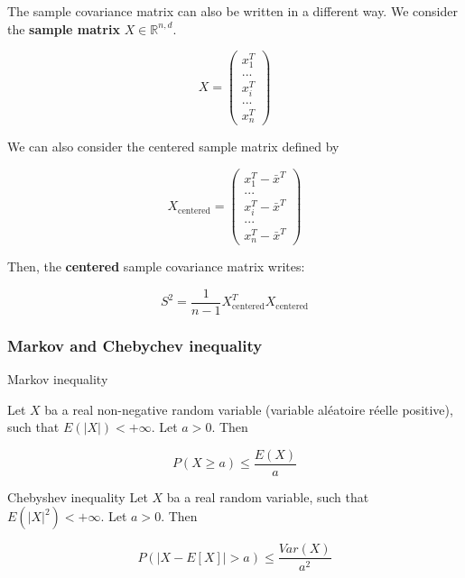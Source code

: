 \documentclass[
10pt, %
a4paper, %
oneside, %
headinclude,footinclude, %
BCOR5mm, %
]{scrartcl}
\begin{document}
\begin{remark}
    The sample covariance matrix can also be written in a different way. We consider the \textbf{{sample matrix}} $X\in \mathbb{R}^{n,d}$.

    \begin{equation*}
    X=\begin{pmatrix}
	x_1^T\\
...\\
	x_i^T\\
...\\
	x_n^T
\end{pmatrix}
    \end{equation*}

    We can also consider the centered sample matrix defined by

    \begin{equation*}
	X_{\text{centered}}=\begin{pmatrix}
	x_1^T- \bar{x}^T\\
...\\
	x_i^T- \bar{x}^T\\
...\\
	x_n^T- \bar{x}^T
\end{pmatrix}
    \end{equation*}

    Then, the \textbf{{centered}} sample covariance matrix writes:

    \begin{equation*}
	S^2 = \frac{1}{n-1} X_{\text{centered}}^TX_{\text{centered}}
    \end{equation*}
\end{remark}

\subsubsection{\large\color{Periwinkle}Markov and Chebychev inequality}

\begin{proposition}{Markov inequality}

    Let $X$ ba a real non-negative random variable (variable aléatoire réelle positive), such that $E(|X|)<+\infty$. Let $a>0$. Then

    \begin{equation}
	P(X\geq a)\leq \frac{E(X)}{a} 
    \end{equation}
    
\end{proposition}

\begin{proposition}{Chebyshev inequality}
    Let $X$ ba a real random variable, such that $E(|X|^2)<+\infty$. Let $a>0$. Then

    \begin{equation}
	P(|X-E[X]|>a)\leq \frac{Var(X)}{a^2} 
    \end{equation}
\end{proposition}
\end{document}
